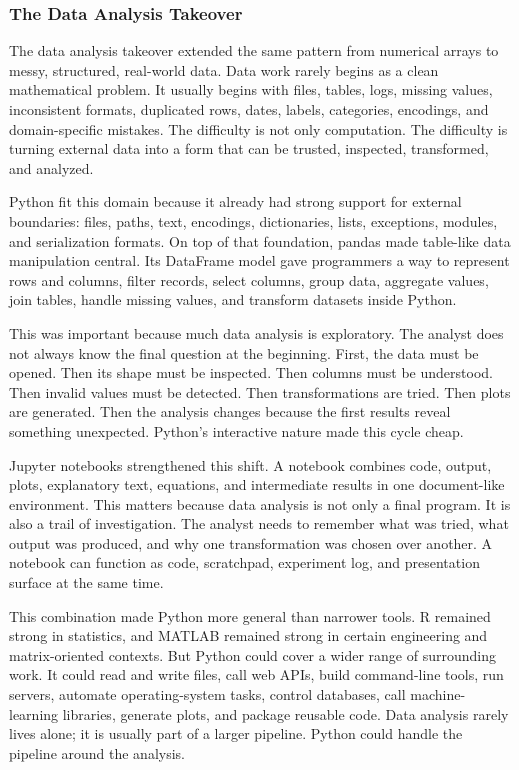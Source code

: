 \subsubsection{The Data Analysis Takeover}

The data analysis takeover extended the same pattern from numerical arrays to messy, structured, real-world data. Data work rarely begins as a clean mathematical problem. It usually begins with files, tables, logs, missing values, inconsistent formats, duplicated rows, dates, labels, categories, encodings, and domain-specific mistakes. The difficulty is not only computation. The difficulty is turning external data into a form that can be trusted, inspected, transformed, and analyzed.

Python fit this domain because it already had strong support for external boundaries: files, paths, text, encodings, dictionaries, lists, exceptions, modules, and serialization formats. On top of that foundation, pandas made table-like data manipulation central. Its DataFrame model gave programmers a way to represent rows and columns, filter records, select columns, group data, aggregate values, join tables, handle missing values, and transform datasets inside Python.

This was important because much data analysis is exploratory. The analyst does not always know the final question at the beginning. First, the data must be opened. Then its shape must be inspected. Then columns must be understood. Then invalid values must be detected. Then transformations are tried. Then plots are generated. Then the analysis changes because the first results reveal something unexpected. Python's interactive nature made this cycle cheap.

Jupyter notebooks strengthened this shift. A notebook combines code, output, plots, explanatory text, equations, and intermediate results in one document-like environment. This matters because data analysis is not only a final program. It is also a trail of investigation. The analyst needs to remember what was tried, what output was produced, and why one transformation was chosen over another. A notebook can function as code, scratchpad, experiment log, and presentation surface at the same time.

This combination made Python more general than narrower tools. R remained strong in statistics, and MATLAB remained strong in certain engineering and matrix-oriented contexts. But Python could cover a wider range of surrounding work. It could read and write files, call web APIs, build command-line tools, run servers, automate operating-system tasks, control databases, call machine-learning libraries, generate plots, and package reusable code. Data analysis rarely lives alone; it is usually part of a larger pipeline. Python could handle the pipeline around the analysis.

